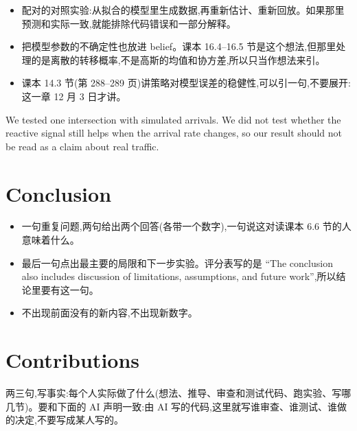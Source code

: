 \documentclass{article}
\newenvironment{pts}{\begin{itemize}[nosep,leftmargin=1.15em,topsep=1pt]}{\end{itemize}}
\begin{document}
\begin{note}
\begin{pts}
\item 配对的对照实验:从拟合的模型里生成数据,再重新估计、重新回放。如果那里预测和实际一致,就能排除代码错误和一部分解释。
\item 把模型参数的不确定性也放进 belief。课本 16.4--16.5 节是这个想法,但那里处理的是离散的转移概率,不是高斯的均值和协方差,所以只当作想法来引。
\item 课本 14.3 节(第 288--289 页)讲策略对模型误差的稳健性,可以引一句,不要展开:这一章 12 月 3 日才讲。
\end{pts}
\end{note}

\begin{model}
We tested one intersection with simulated arrivals. We did not test whether the reactive signal still helps when the arrival rate changes, so our result should not be read as a claim about real traffic.
\end{model}

\section{Conclusion}

\begin{note}[约 70 词,五句左右]
\begin{pts}
\item 一句重复问题,两句给出两个回答(各带一个数字),一句说这对读课本 6.6 节的人意味着什么。
\item 最后一句点出最主要的局限和下一步实验。评分表写的是 ``The conclusion also includes discussion of limitations, assumptions, and future work'',所以结论里要有这一句。
\item 不出现前面没有的新内容,不出现新数字。
\end{pts}
\end{note}

\section*{Contributions}

\begin{note}
两三句,写事实:每个人实际做了什么(想法、推导、审查和测试代码、跑实验、写哪几节)。要和下面的 AI 声明一致:由 AI 写的代码,这里就写谁审查、谁测试、谁做的决定,不要写成某人写的。
\end{note}
\end{document}
